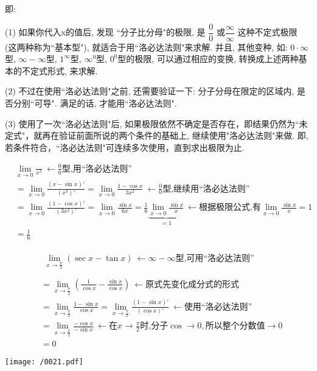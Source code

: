 \documentclass[UTF8]{ctexart}
\begin{document}
即: 

(1) 如果你代入x的值后, 发现 ``分子比分母"的极限, 是 $ \dfrac{0} {0}$ 或$ \dfrac{\infty} {\infty}$ 这种不定式极限 (这两种称为``基本型"), 就适合于用``洛必达法则"来求解. 并且, 其他变种, 如: $ 0 \cdot \infty$型, $\infty-\infty$型, $1^{\infty}$型, $\infty^0$型, $0^0$型的极限,  可以通过相应的变换, 转换成上述两种基本的不定式形式, 来求解.

(2) 不过在使用``洛必达法则"之前, 还需要验证一下: 分子分母在限定的区域内, 是否分别``可导". 满足的话, 才能用``洛必达法则".

(3) 使用了一次``洛必达法则"后, 如果极限依然不确定是否存在，即结果仍然为``未定式"，就再在验证前面所说的两个条件的基础上, 继续使用"洛必达法则"来做.  即, 若条件符合，``洛必达法则"可连续多次使用，直到求出极限为止.


\begin{myEnvSample}
	\begin{align*}  %
		&\lim_{x\rightarrow 0}\frac{}{x^3}\ \gets \frac{0}{0}\text{型,用}\text{洛必达法则}\\
		&=\lim_{x\rightarrow 0}\frac{\left( x-\sin x \right) '}{\left( x^3 \right) '}=\lim_{x\rightarrow 0}\frac{1-\cos x}{3x^2}\ \gets \frac{0}{0}\text{型,继续用}\text{洛必达法则}\\
		&=\lim_{x\rightarrow 0}\frac{\left( 1-\cos x \right) '}{\left( 3x^2 \right) '}=\lim_{x\rightarrow 0}\frac{\sin x}{6x}=\frac{1}{6}\underset{=1}{\underbrace{\lim_{x\rightarrow 0}\frac{\sin x}{x}}}\ \gets \text{根据极限公式,有}\lim_{x\rightarrow 0}\frac{\sin x}{x}=1\\
		&=\frac{1}{6}
	\end{align*}
\end{myEnvSample}




\begin{myEnvSample}
	\begin{align*}  %
		&\begin{matrix}
			\lim_{x\rightarrow \frac{\pi}{2}}\left( \sec x-\tan x \right) \ \gets \infty -\infty \text{型,可用}\text{洛必达法则}\\
		\end{matrix}\\
		&=\lim_{x\rightarrow \frac{\pi}{2}}\left( \frac{1}{\cos x}-\frac{\sin x}{\cos x} \right) \ \gets \text{原式先变化成分式的形式}\\
		&=\lim_{x\rightarrow \frac{\pi}{2}}\frac{1-\sin x}{\cos x}=\lim_{x\rightarrow \frac{\pi}{2}}\frac{\left( 1-\sin x \right) '}{\left( \cos x \right) '}\ \gets \text{使用}\text{洛必达法则}\\
		&=\lim_{x\rightarrow \frac{\pi}{2}}\frac{-\cos x}{-\sin x}\ \gets \text{在}x\rightarrow \frac{\pi}{2}\text{时,分子}\cos \rightarrow 0,\text{所以整个分数值}\rightarrow 0\\
		&=0
	\end{align*}
	
	\texttt{[image: /0021.pdf]}
\end{myEnvSample}
\end{document}
